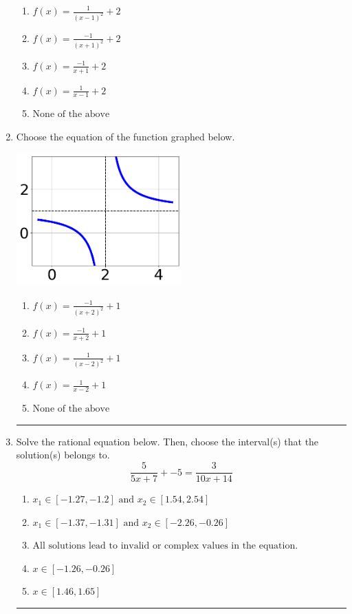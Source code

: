 \documentclass[14pt]{extbook}
\newcommand{\litem}[1]{\item#1\hspace*{-1cm}\rule{\textwidth}{0.4pt}}
\begin{document}
\begin{enumerate}
{\begin{center}
\end{center}
\begin{enumerate}[label=\Alph*.]
\item \( f(x) = \frac{1}{(x - 1)^2} + 2 \)
\item \( f(x) = \frac{-1}{(x + 1)^2} + 2 \)
\item \( f(x) = \frac{-1}{x + 1} + 2 \)
\item \( f(x) = \frac{1}{x - 1} + 2 \)
\item \( \text{None of the above} \)

\end{enumerate} }
\litem{
Choose the equation of the function graphed below.
\begin{center}
    \includegraphics[width=0.5\textwidth]{../Figures/rationalGraphToEquationCopyB.png}
\end{center}
\begin{enumerate}[label=\Alph*.]
\item \( f(x) = \frac{-1}{(x + 2)^2} + 1 \)
\item \( f(x) = \frac{-1}{x + 2} + 1 \)
\item \( f(x) = \frac{1}{(x - 2)^2} + 1 \)
\item \( f(x) = \frac{1}{x - 2} + 1 \)
\item \( \text{None of the above} \)

\end{enumerate} }
\litem{
Solve the rational equation below. Then, choose the interval(s) that the solution(s) belongs to.\[ \frac{5}{5x + 7} + -5 = \frac{3}{10x + 14} \]\begin{enumerate}[label=\Alph*.]
\item \( x_1 \in [-1.27, -1.2] \text{ and } x_2 \in [1.54,2.54] \)
\item \( x_1 \in [-1.37, -1.31] \text{ and } x_2 \in [-2.26,-0.26] \)
\item \( \text{All solutions lead to invalid or complex values in the equation.} \)
\item \( x \in [-1.26,-0.26] \)
\item \( x \in [1.46,1.65] \)


\end{enumerate}}
\end{enumerate}
\end{document}
